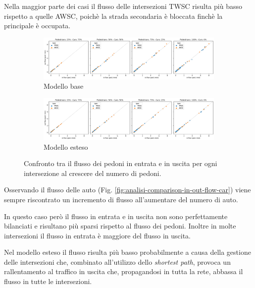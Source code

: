 Nella maggior parte dei casi il flusso delle intersezioni TWSC risulta più basso rispetto a quelle AWSC, poichè la strada secondaria
è bloccata finchè la principale è occupata.

\begin{figure}[ht]
    \centering
    \begin{subfigure}{\textwidth}
        \centering
        \includegraphics[width=\textwidth]{images/analisi/comparison-base-in-out-flow-ped.png}
        \caption{Modello base}
    \end{subfigure}

    \begin{subfigure}{\textwidth}
        \centering
        \includegraphics[width=\textwidth]{images/analisi/comparison-new-in-out-flow-ped.png}
        \caption{Modello esteso}
    \end{subfigure}
    \caption{
        Confronto tra il flusso dei pedoni in entrata e in uscita per ogni intersezione al crescere del numero di pedoni.
    }
    \label{fig:analisi-comparison-in-out-flow-ped}
\end{figure}

Osservando il flusso delle auto (Fig. \ref{fig:analisi-comparison-in-out-flow-car})
viene sempre riscontrato un incremento di flusso all'aumentare del numero di auto.

In questo caso però il flusso in entrata e in uscita non sono perfettamente bilanciati e risultano più sparsi rispetto al flusso dei pedoni.
Inoltre in molte intersezioni il flusso in entrata è maggiore del flusso in uscita.

Nel modello esteso il flusso risulta più basso
probabilmente a causa della gestione delle intersezioni che, combinato all'utilizzo dello \textit{shortest path},
provoca un rallentamento al traffico in uscita che, propagandosi in tutta la rete, abbassa il flusso in tutte le intersezioni.

